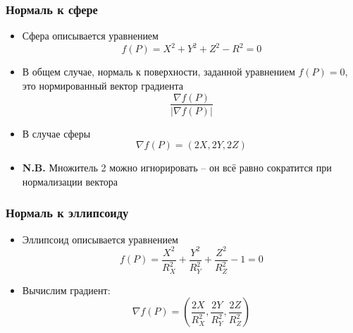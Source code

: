 \documentclass[10pt,handout]{beamer}
\begin{document}
\begin{frame}[fragile]
\frametitle{Нормаль к сфере}
\begin{itemize}
\item Сфера описывается уравнением \begin{equation*}f(P) = X^2+Y^2+Z^2-R^2 = 0\end{equation*}
\pause
\item В общем случае, нормаль к поверхности, заданной уравнением \begin{math}f(P)=0\end{math}, это нормированный вектор градиента \begin{equation*}\frac{\nabla f(P)}{|\nabla f(P)|}\end{equation*}
\pause
\item В случае сферы \begin{equation*}\nabla f(P) = (2X, 2Y, 2Z)\end{equation*}
\pause
\item \alert{\textbf{N.B.}} Множитель 2 можно игнорировать -- он всё равно сократится при нормализации вектора
\end{itemize}
\end{frame}

\begin{frame}[fragile]
\frametitle{Нормаль к эллипсоиду}
\begin{itemize}
\item Эллипсоид описывается уравнением \begin{equation*}f(P) = \frac{X^2}{R_X^2}+\frac{Y^2}{R_Y^2}+\frac{Z^2}{R_Z^2}-1 = 0\end{equation*}
\pause
\item Вычислим градиент: \begin{equation*}\nabla f(P) = \left(\frac{2X}{R_X^2}, \frac{2Y}{R_Y^2}, \frac{2Z}{R_Z^2}\right)\end{equation*}
\end{itemize}
\end{frame}
\end{document}
